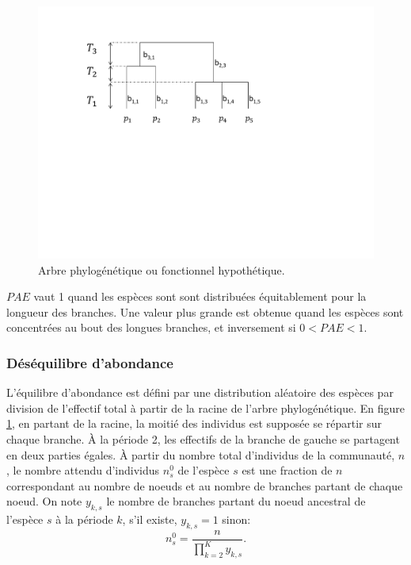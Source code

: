\documentclass[
  11pt,
  french,
  a4paper,
  extrafontsizes,onecolumn,openright
  ]{memoir}
\begin{document}
\scriptsize

\begin{figure}

{\centering \includegraphics[width=0.8\linewidth]{images/ArbreA} 

}

\caption{Arbre phylogénétique ou fonctionnel hypothétique.}\label{fig:ArbreA3}
\end{figure}

\normalsize

\(\mathit{PAE}\) vaut 1 quand les espèces sont sont distribuées équitablement pour la longueur des branches.
Une valeur plus grande est obtenue quand les espèces sont concentrées au bout des longues branches, et inversement si \(0<\mathit{PAE}<1\).

\hypertarget{duxe9suxe9quilibre-dabondance}{%
\subsubsection{Déséquilibre d'abondance}\label{duxe9suxe9quilibre-dabondance}}

L'équilibre d'abondance est défini par une distribution aléatoire des espèces par division de l'effectif total à partir de la racine de l'arbre phylogénétique.
En figure \ref{fig:ArbreA3}, en partant de la racine, la moitié des individus est supposée se répartir sur chaque branche.
À la période 2, les effectifs de la branche de gauche se partagent en deux parties égales.
À partir du nombre total d'individus de la communauté, \(n\), le nombre attendu d'individus \(n_s^0\) de l'espèce \(s\) est une fraction de \(n\) correspondant au nombre de noeuds et au nombre de branches partant de chaque noeud.
On note \(y_{k,s}\) le nombre de branches partant du noeud ancestral de l'espèce \(s\) à la période \(k\), s'il existe, \(y_{k,s}=1\) sinon:
\begin{equation}
  n_s^0 = \frac{n}{\prod_{k=2}^{K}{y_{k,s}}}.
\end{equation}
\end{document}
